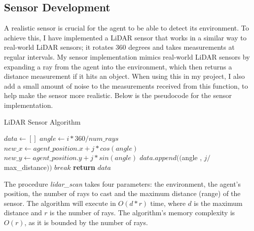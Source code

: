 \documentclass[12pt]{article}
\begin{document}
\subsection{Sensor Development}
A realistic sensor is crucial for the agent to be able to detect its environment. To achieve this, I have implemented a LiDAR sensor
that works in a similar way to real-world LiDAR sensors; it rotates 360 degrees and takes measurements at regular intervals. My sensor
implementation mimics real-world LiDAR sensors by expanding a ray from the agent into the environment, which then returns a distance
measurement if it hits an object. When using this in my project, I also add a small amount of noise to the measurements received from
this function, to help make the sensor more realistic. Below is the pseudocode for the sensor implementation.\\
\begin{algorithm}[H]
    \caption{LiDAR Sensor Algorithm}\label{alg:lidar_sensor}
    \begin{algorithmic}
            \State $data \gets []$
                \State $angle \gets i * 360 / num\_rays$
                    \State $new\_x \gets agent\_position.x + j * cos(angle)$
                    \State $new\_y \gets agent\_position.y + j * sin(angle)$
                        \State $data.append(($angle , $j / $max\_distance$))$
                        \State $break$
                    \EndIf
                \EndFor
            \EndFor
            \State \textbf{return} $data$
        \EndFunction{}
    \end{algorithmic}
\end{algorithm}
The procedure \textit{lidar\_scan} takes four parameters: the environment, the agent's position, the number of rays to cast and the
maximum distance (range) of the sensor. The algorithm will execute in \(O(d * r)\) time, where \(d\) is the maximum distance and \(r\) is
the number of rays. The algorithm's memory complexity is \(O(r)\), as it is bounded by the number of rays.\\
\end{document}
